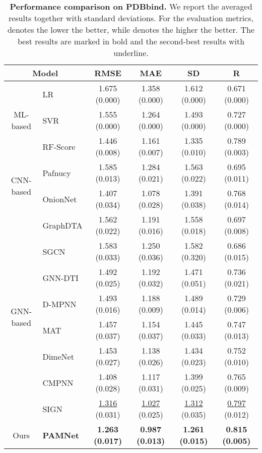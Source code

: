 \documentclass[fleqn,10pt]{wlscirep}
\newcommand{\method}{PAMNet\xspace}
\begin{document}
\begin{table}[t]
\small
\centering
\begin{tabular}{clcccc}
\toprule
    \multicolumn{2}{c}{Model} & RMSE  & MAE  & SD  & R  \\
\midrule
     \multirow{3}{*}{ML-based} & LR & 1.675 (0.000)  & 1.358 (0.000)  & 1.612 (0.000)  & 0.671 (0.000) \\
     & SVR & 1.555 (0.000)  & 1.264 (0.000)  & 1.493 (0.000)  & 0.727 (0.000) \\
     & RF-Score & 1.446 (0.008)  & 1.161 (0.007)  & 1.335 (0.010)  & 0.789 (0.003) \\
\midrule
     \multirow{2}{*}{CNN-based} & Pafnucy & 1.585 (0.013)  & 1.284 (0.021)  & 1.563 (0.022)  & 0.695 (0.011) \\
     & OnionNet & 1.407 (0.034)  & 1.078 (0.028)  & 1.391 (0.038)  & 0.768 (0.014) \\
\midrule
     \multirow{8}{*}{GNN-based} & GraphDTA & 1.562 (0.022)  & 1.191 (0.016)  & 1.558 (0.018)  & 0.697 (0.008) \\
     & SGCN & 1.583 (0.033)  & 1.250 (0.036)  & 1.582 (0.320)  & 0.686 (0.015) \\
     & GNN-DTI & 1.492 (0.025)  & 1.192 (0.032)  & 1.471 (0.051)  & 0.736 (0.021) \\
     & D-MPNN & 1.493 (0.016) & 1.188 (0.009) & 1.489 (0.014) & 0.729 (0.006) \\
     & MAT & 1.457 (0.037)  & 1.154 (0.037)  & 1.445 (0.033)  & 0.747 (0.013) \\
     & DimeNet & 1.453 (0.027) & 1.138 (0.026) & 1.434 (0.023) & 0.752 (0.010) \\
     & CMPNN & 1.408 (0.028) & 1.117 (0.031) & 1.399 (0.025) & 0.765 (0.009) \\
     & SIGN & \underline{1.316} (0.031) & \underline{1.027} (0.025) & \underline{1.312} (0.035) & \underline{0.797} (0.012)\\
\midrule
     Ours & \textbf{\method} & \textbf{1.263 (0.017)} & \textbf{0.987 (0.013)} & \textbf{1.261 (0.015)} & \textbf{0.815 (0.005)}\\
\bottomrule
\end{tabular}
\caption{\textbf{Performance comparison on PDBbind.} We report the averaged results together with standard deviations. For the evaluation metrics,  denotes the lower the better, while  denotes the higher the better. The best results are marked in bold and the second-best results with underline. }
\label{table:PDBBind}
\end{table}
\end{document}
